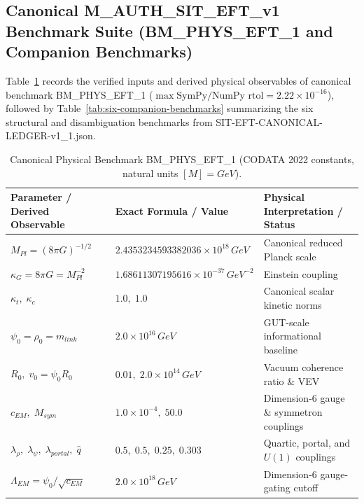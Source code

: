 \documentclass[american,11pt,letterpaper]{article}
\def\mathrm#1{#1}%
\def\texttt#1{#1}%
\begin{document}
\begin{longtable}{|p{2.3cm}|p{4.3cm}|p{8.4cm}|}
\hline
\end{longtable}

\subsection{Canonical \texttt{M\_AUTH\_SIT\_EFT\_v1} Benchmark Suite (\texttt{BM\_PHYS\_EFT\_1} and Companion Benchmarks)}

Table~\ref{tab:bm-phys-eft-1} records the verified inputs and derived physical observables of canonical benchmark \texttt{BM\_PHYS\_EFT\_1} ($\max\text{SymPy/NumPy rtol} = 2.22\times 10^{-16}$), followed by Table~\ref{tab:six-companion-benchmarks} summarizing the six structural and disambiguation benchmarks from \texttt{SIT-EFT-CANONICAL-LEDGER-v1\_\allowbreak{}1.\allowbreak{}json}.

\begin{table}[htbp]
\centering
\caption{Canonical Physical Benchmark \texttt{BM\_PHYS\_EFT\_1} (CODATA 2022 constants, natural units $[M] = \mathrm{GeV}$).}
\label{tab:bm-phys-eft-1}
\vspace{0.4em}
\footnotesize
\begin{tabular}{|>{\raggedright\arraybackslash}p{5.5cm}|>{\raggedright\arraybackslash}p{4.3cm}|>{\raggedright\arraybackslash}p{5.0cm}|}
\hline
\textbf{Parameter / Derived Observable} & \textbf{Exact Formula / Value} & \textbf{Physical Interpretation / Status} \\
\hline
$M_{\mathrm{Pl}} = (8\pi G)^{-1/2}$ & $2.4353234593382036 \times 10^{18}\,\mathrm{GeV}$ & Canonical reduced Planck scale \\
$\kappa_G = 8\pi G = M_{\mathrm{Pl}}^{-2}$ & $1.68611307195616 \times 10^{-37}\,\mathrm{GeV}^{-2}$ & Einstein coupling \\
$\kappa_t,\;\kappa_c$ & $1.0,\;1.0$ & Canonical scalar kinetic norms \\
$\psi_0 = \rho_0 = m_{\mathrm{link}}$ & $2.0 \times 10^{16}\,\mathrm{GeV}$ & GUT-scale informational baseline \\
$R_0,\;v_0 = \psi_0 R_0$ & $0.01,\;2.0 \times 10^{14}\,\mathrm{GeV}$ & Vacuum coherence ratio \& VEV \\
$c_{\mathrm{EM}},\;M_{\mathrm{sym}}$ & $1.0 \times 10^{-4},\;50.0$ & Dimension-6 gauge \& symmetron couplings \\
$\lambda_\rho,\;\lambda_\psi,\;\lambda_{\mathrm{portal}},\;\hat{q}$ & $0.5,\;0.5,\;0.25,\;0.303$ & Quartic, portal, and $U(1)$ couplings \\
\hline
$\Lambda_{\mathrm{EM}} = \psi_0 / \sqrt{c_{\mathrm{EM}}}$ & $2.0 \times 10^{18}\,\mathrm{GeV}$ & Dimension-6 gauge-gating cutoff \\

\end{tabular}
\end{table}
\end{document}
